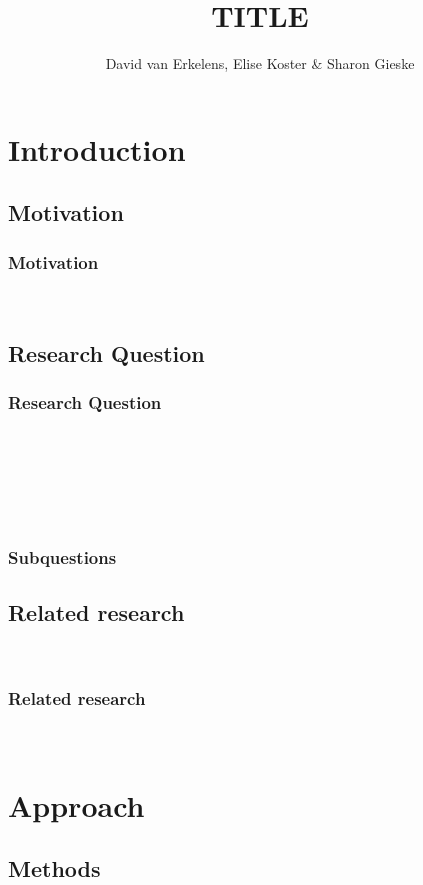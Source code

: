 \documentclass[t,ignorenonframetext]{beamer}
\title{TITLE}
\author{David van Erkelens, Elise Koster \& Sharon Gieske}
\begin{document}
\frame{
\maketitle
}
\frame{
\tableofcontents
}

\section[Introduction]{Introduction}

\subsection{Motivation}
\begin{frame}
\frametitle{Motivation}~\\



\end{frame}

\subsection{Research Question}
\begin{frame}
\frametitle{Research Question}
 ~\\ ~\\ ~\\


\end{frame}

\begin{frame}~\\

\frametitle{Subquestions}

\end{frame}



\subsection{Related research}~\\


\begin{frame}
\frametitle{Related research}
~\\

\end{frame}


\section[Approach]{Approach}
\subsection{Methods}
\end{document}
